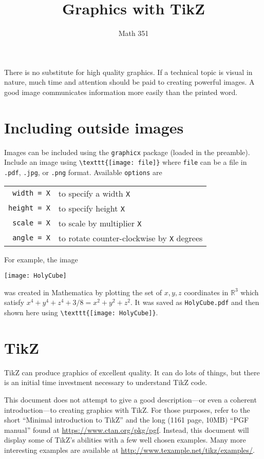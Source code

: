 \documentclass{article}
\title{Graphics with TikZ}
\author{Math 351}
\date{}
\begin{document}
\maketitle

There is no substitute for high quality graphics.  If a technical topic is visual in nature, much 
time and attention should be paid to creating powerful images.  A good image communicates 
information more easily than the printed word.

\section{Including outside images}

Images can be included using the \verb~graphicx~ package (loaded in the preamble).  Include
an image using \verb~\texttt{[image: file]}~ where \verb~file~ can be a file
in \verb~.pdf~, \verb~.jpg~, or \verb~.png~ format.  Available \verb~options~ are
\begin{center}
\begin{tabular}{r l}
\verb~width = X~ & to specify a width \verb~X~ \\
\verb~height = X~ & to specify height \verb~X~ \\
\verb~scale = X~ & to scale by multiplier \verb~X~ \\
\verb~angle = X~ & to rotate counter-clockwise by \verb~X~ degrees 
\end{tabular}
\end{center}
For example, the image
\begin{center}
\texttt{[image: HolyCube]}
\end{center}
was created in Mathematica by plotting the set of $x,y,z$ coordinates in $\mathbb{R}^3$ which satisfy 
\(x^4+y^4+z^4 + 3/8 = x^2+y^2+z^2 \).  It was saved as \verb~HolyCube.pdf~ and then shown 
here using \verb~\texttt{[image: HolyCube]}~.

\section{TikZ}

TikZ can produce graphics of excellent quality.  
It can do lots of things, but there is an initial time investment necessary to
understand TikZ code.

This document does not attempt to give a good description---or even a coherent 
introduction---to creating graphics with TikZ.  For those 
purposes, refer to the short ``Minimal introduction to TikZ'' and the long (1161 page, 
10MB) ``PGF manual'' found at \url{https://www.ctan.org/pkg/pgf}.  Instead, this 
document will display some of TikZ's abilities with a few well chosen examples.  Many 
more interesting examples are available 
at \url{http://www.texample.net/tikz/examples/}. 
\end{document}
